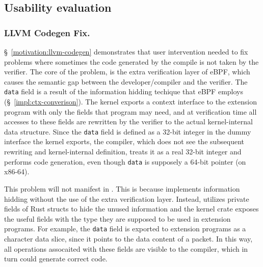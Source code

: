 \subsection{Usability evaluation}
\subsubsection{LLVM Codegen Fix.}
\S~\ref{motivation:llvm-codegen} demonstrates that user intervention needed to
    fix problems where sometimes the code generated by the compile is not taken
    by the verifier.
The core of the problem, is the extra verification layer of eBPF, which causes
    the semantic gap between the developer/compiler and the verifier.
The \texttt{data} field is a result of the information hidding techique that
    eBPF employs (\S~\ref{impl:ctx-converison}).
The kernel exports a context interface to the extension program with only
    the fields that program may need, and at verification time all accesses to
    these fields are rewritten by the verifier to the actual kernel-internal
    data structure.
Since the \texttt{data} field is defined as a 32-bit integer in the dummy
    interface the kernel exports, the compiler, which does not see the
    subsequent rewriting and kernel-internal definition, treats it as a real
    32-bit integer and performs code generation, even though \texttt{data} is
    supposely a 64-bit pointer (on x86-64).

This problem will not manifest in \projname{}.
This is because \projname{} implements information hidding without the use of
    the extra verification layer.
Instead, \projname{} utilizes private fields of Rust structs to hide the unused
    information and the kernel crate exposes the useful fields with the type
    they are supposed to be used in extension programs.
For example, the \texttt{data} field is exported to extension programs as a
    character data slice, since it points to the data content of a packet.
In this way, all operations assocaited with these fields are visible to the
    compiler, which in turn could generate correct code.
